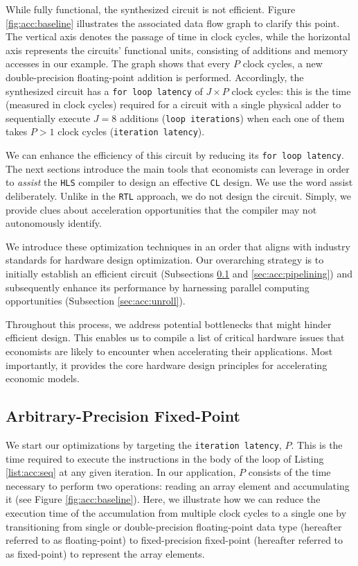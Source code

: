 \documentclass[12pt,american]{article}
\newcommand{\Naccsize}{J}
\begin{document}
While fully functional, the synthesized circuit is not efficient. Figure \ref{fig:acc:baseline} illustrates the associated data flow graph to clarify this point. The vertical axis denotes the passage of time in clock cycles, while the horizontal axis represents the circuits' functional units, consisting of additions and memory accesses in our example. The graph shows that every $P$ clock cycles, a new double-precision floating-point addition is performed. Accordingly, the synthesized circuit has a \texttt{for loop latency} of $\Naccsize\times P$ clock cycles: this is the time (measured in clock cycles) required for a circuit with a single physical adder to sequentially execute $\Naccsize=8$ additions (\texttt{loop iterations}) when each one of them takes $P> 1$ clock cycles (\texttt{iteration latency}).

We can enhance the efficiency of this circuit by reducing its \texttt{for loop latency}. The next sections introduce the main tools that economists can leverage in order to \textit{assist} the \texttt{HLS} compiler to design an effective \texttt{CL} design. We use the word assist deliberately. Unlike in the \texttt{RTL} approach, we do not design the circuit. Simply, we provide clues about acceleration opportunities that the compiler may not autonomously identify. 

We introduce these optimization techniques in an order that aligns with industry standards for hardware design optimization. Our overarching strategy is to initially establish an efficient circuit (Subsections \ref{sec:acc:fix-pre} and \ref{sec:acc:pipelining}) and subsequently enhance its performance by harnessing parallel computing opportunities (Subsection \ref{sec:acc:unroll}).

Throughout this process, we address potential bottlenecks that might hinder efficient design. This enables us to compile a list of critical hardware issues that economists are likely to encounter when accelerating their applications. Most importantly, it provides the core hardware design principles for accelerating economic models.

\subsection{Arbitrary-Precision Fixed-Point}\label{sec:acc:fix-pre}

We start our optimizations by targeting the \texttt{iteration latency}, $P$. This is the time required to execute the instructions in the body of the loop of Listing \ref{list:acc:seq} at any given iteration.  In our application, $P$ consists of the time necessary to perform two operations: reading an array element and accumulating it (see Figure \ref{fig:acc:baseline}). Here, we illustrate how we can reduce the execution time of the accumulation from multiple clock cycles to a single one by transitioning from single or double-precision floating-point data type (hereafter referred to as floating-point) to fixed-precision fixed-point (hereafter referred to as fixed-point) to represent the array elements.
\end{document}
